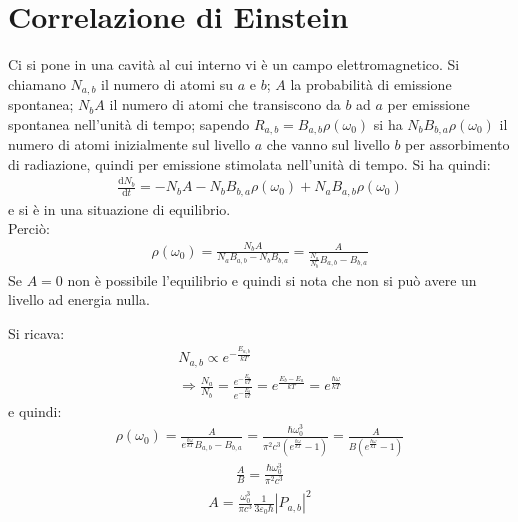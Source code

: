 \section{Correlazione di Einstein} %
Ci si pone in una cavità al cui interno vi è un campo elettromagnetico. Si chiamano $N_{a,b}$ il numero di atomi su $a$ e $b$; $A$ la probabilità di emissione spontanea; $N_bA$ il numero di atomi che transiscono da $b$ ad $a$ per emissione spontanea nell'unità di tempo; sapendo $R_{a,b}=B_{a,b}\rho\left(\omega _0\right)$ si ha $N_bB_{b,a}\rho\left(\omega _0\right)$ il numero di atomi inizialmente sul livello $a$ che vanno sul livello $b$ per assorbimento di radiazione, quindi per emissione stimolata nell'unità di tempo. Si ha quindi:
\begin{equation}\begin{split}
\frac{\textrm{d}N_b}{\textrm{d}t}=-N_bA-N_bB_{b,a}\rho\left(\omega _0\right)+N_aB_{a,b}\rho\left(\omega _0\right)
\end{split}\end{equation}
e si è in una situazione di equilibrio. \\ Perciò:
\begin{equation}\begin{split}
\rho\left(\omega _0\right)=\frac{N_bA}{N_aB_{a,b}-N_bB_{b,a}}=\frac{A}{\frac{N_a}{N_b}B_{a,b}-B_{b,a}}
\end{split}\end{equation}
Se $A=0$ non è possibile l'equilibrio e quindi si nota che non si può avere un livello ad energia nulla.

Si ricava:
\begin{equation}\begin{split}
N_{a,b}\propto e^{-\frac{E_{a,b}}{kT}}\\
\Longrightarrow \frac{N_a}{N_b}=\frac{e^{-\frac{E_{a}}{kT}}}{e^{-\frac{E_{b}}{kT}}}=e^{\frac{E_b-E_a}{kT}}=e^{\frac{\hbar \omega }{kT}}
\end{split}\end{equation}
e quindi:
\begin{equation}\begin{split}
\rho\left(\omega _0\right)=\frac{A}{e^{\frac{\hbar \omega }{kT}}B_{a,b}-B_{b,a}}=\frac{\hbar \omega _0^3}{\pi^2c^3\left(e^{\frac{\hbar \omega }{kT}}-1\right)}=\frac{A}{B\left(e^{\frac{\hbar \omega }{kT}}-1\right)}
\end{split}\end{equation}
\begin{equation}\begin{split}
\frac{A}{B}=\frac{\hbar \omega _0^3}{\pi^2c^3}
\end{split}\end{equation}
\begin{equation}\begin{split}
A=\frac{\omega _0^3}{\pi c^3}\frac{1}{3\varepsilon_0\hbar }\left|P_{a,b}\right|^2
\end{split}\end{equation}

